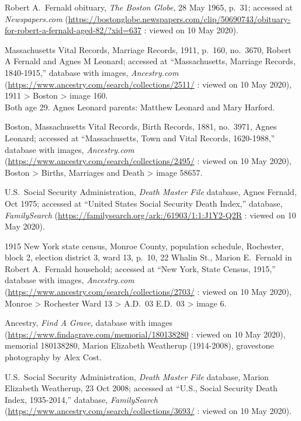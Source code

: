 \begin{thebibliography}{999}
	Robert A.\ Fernald obituary, \textit{The Boston Globe}, 28 May 1965, p.\ 31; accessed at \textit{Newspapers.com} (\url{https://bostonglobe.newspapers.com/clip/50690743/obituary-for-robert-a-fernald-aged-82/?xid=637} : viewed on 10 May 2020).
	
	Massachusetts Vital Records, Marriage Records, 1911, p.\ 160, no.\ 3670, Robert A Fernald and Agnes M Leonard; accessed at ``Massachusetts, Marriage Records, 1840-1915,'' database with images, \textit{Ancestry.com} (\url{https://www.ancestry.com/search/collections/2511/} : viewed on 10 May 2020), 1911 > Boston > image 160.\\
	Both age 29. Agnes Leonard parents: Matthew Leonard and Mary Harford.
	
	Boston, Massachusetts Vital Records, Birth Records, 1881, no.\ 3971, Agnes Leonard; accessed at ``Massachusetts, Town and Vital Records, 1620-1988,'' database with images, \textit{Ancestry.com} (\url{https://www.ancestry.com/search/collections/2495/} : viewed on 10 May 2020), Boston > Births, Marriages and Death > image 58657.
	
	U.S.\ Social Security Administration, \textit{Death Master File} database, Agnes Fernald, Oct 1975; accessed at ``United States Social Security Death Index,'' database, \textit{FamilySearch} (\url{https://familysearch.org/ark:/61903/1:1:J1Y2-Q2R} : viewed on 10 May 2020).
	
	1915 New York state census, Monroe County, population schedule, Rochester, block 2, election district 3, ward 13, p.\ 10, 22 Whalin St., Marion E.\ Fernald in Robert A.\ Fernald household; accessed at ``New York, State Census, 1915,'' database with images, \textit{Ancestry.com} (\url{https://www.ancestry.com/search/collections/2703/} : viewed on 10 May 2020), Monroe > Rochester Ward 13 > A.D.\ 03 E.D.\ 03 > image 6.
	
	Ancestry, \textit{Find A Grave}, database with images (\url{https://www.findagrave.com/memorial/180138280} : viewed on 10 May 2020), memorial 180138280, Marion Elizabeth Weatherup (1914-2008), gravestone photography by Alex Cost.
	
	U.S.\ Social Security Administration, \textit{Death Master File} database, Marion Elizabeth Weatherup, 23 Oct 2008; accessed at ``U.S., Social Security Death Index, 1935-2014,'' database, \textit{FamilySearch} (\url{https://www.ancestry.com/search/collections/3693/} : viewed on 10 May 2020).
	

\end{thebibliography}
